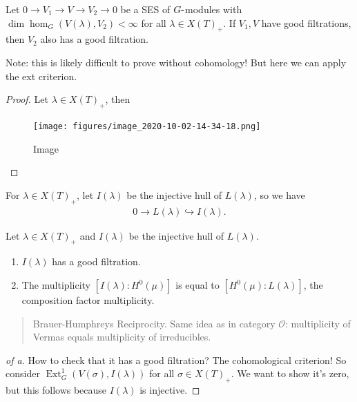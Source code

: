 \begin{corollary}[?]

Let \(0\to V_1 \to V \to V_2 \to 0\) be a SES of \(G{\hbox{-}}\)modules
with \(\dim \hom_G(V(\lambda), V_2) < \infty\) for all
\(\lambda \in X(T)_+\). If \(V_1, V\) have good filtrations, then
\(V_2\) also has a good filtration.

\end{corollary}

Note: this is likely difficult to prove without cohomology! But here we
can apply the ext criterion.

\begin{proof}

Let \(\lambda \in X(T)_+\), then

\begin{figure}
\centering
\texttt{[image: figures/image\_2020-10-02-14-34-18.png]}
\caption{Image}
\end{figure}

\end{proof}

For \(\lambda \in X(T)_+\), let \(I(\lambda)\) be the injective hull of
\(L(\lambda)\), so we have
\begin{align*}  
0 \to L(\lambda) \hookrightarrow I(\lambda)
.\end{align*}

\begin{theorem}[?]

Let \(\lambda \in X(T)_+\) and \(I(\lambda)\) be the injective hull of
\(L(\lambda)\).

\begin{enumerate}
\def\labelenumi{\alph{enumi}.}
\item
  \(I(\lambda)\) has a good filtration.
\item
  The multiplicity \([I(\lambda): H^0(\mu)]\) is equal to
  \([H^0(\mu): L(\lambda)]\), the composition factor multiplicity.
\end{enumerate}

\begin{quote}
Brauer-Humphreys Reciprocity. Same idea as in category
\({\mathcal{O}}\): multiplicity of Vermas equals multiplicity of
irreducibles.
\end{quote}

\end{theorem}

\begin{proof}[of a]

How to check that it has a good filtration? The cohomological criterion!
So consider \(\operatorname{Ext}^1_G( V(\sigma), I(\lambda) )\) for all
\(\sigma \in X(T)_+\). We want to show it's zero, but this follows
because \(I(\lambda)\) is injective.

\end{proof}

